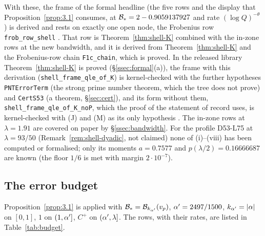 With these, the frame of the formal headline (the five rows and the display that Proposition~\ref{prop:3.1} consumes, at $\mathcal B_*=2-0.9059137927$ and rate
$(\log Q)^{-\theta}$) is derived and rests on exactly one open node, the Frobenius row \texttt{frob\_row\_shell} \tagLm. That row is
Theorem~\ref{thm:shell-K} combined with the in-zone rows at the new bandwidth, and it is derived from Theorem~\ref{thm:shell-K} and the
Frobenius-row chain \texttt{F1c\_chain}, which is proved. In the released library Theorem~\ref{thm:shell-K} is proved (\S\ref{ssec:formal}(a)), the
frame with this derivation (\texttt{shell\_frame\_qle\_of\_K}) is kernel-checked with the further hypotheses \texttt{PNTErrorTerm} (the strong prime number theorem, which the tree does not prove) and \texttt{CertS53}
(a theorem, \S\ref{sec:cert}), and its form without them, \texttt{shell\_frame\_qle\_of\_K\_noP}, which the proof of the statement of record
uses, is kernel-checked with (J) and (M) as its only hypothesis \tagL. The in-zone rows at $\lambda=1.91$ are covered on paper by \S\ref{ssec:bandwidth}.
For the profile D53-L75 at $\lambda=93/50$ (Remark~\ref{rem:shell-dyadic}, not claimed) none of (i)--(viii) has been computed or formalised; only its
moments $a=0.7577$ and $p(\lambda/2)=0.16666687$ are known (the floor $1/6$ is met with margin $2\cdot10^{-7}$).

\subsection{The error budget}
Proposition~\ref{prop:3.1} is applied with $\mathcal B_*=\mathcal B_{k_{\alpha'}}(v_p)$, $\alpha'=2497/1500$, $k_{\alpha'}=\lvert \alpha\rvert$ on $[0,1]$, $1$ on $(1,\alpha']$, $C^+$ on
$(\alpha',\lambda]$. The rows, with their rates, are listed in Table~\ref{tab:budget}.

